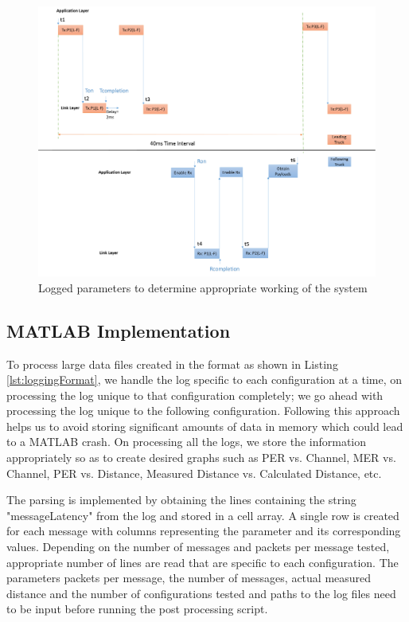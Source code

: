 \begin{figure}[h!]
    \includegraphics[width=1\textwidth]{figures/IndicationofLoggingParameters}
    \centering
    \caption{Logged parameters to determine appropriate working of the system}
    \label{fig:LoggedParametersDetermineAppWorking}    
\end{figure}




\subsection{MATLAB Implementation}
To process large data files created in the format as shown in Listing \ref{lst:loggingFormat}, we handle the log specific to each configuration at a time, on processing the log unique to that configuration completely; we go ahead with processing the log unique to the following configuration. Following this approach helps us to avoid storing significant amounts of data in memory which could lead to a MATLAB crash. On processing all the logs, we store the information appropriately so as to create desired graphs such as PER vs. Channel, MER vs. Channel, PER vs. Distance, Measured Distance vs. Calculated Distance, etc.

The parsing is implemented by obtaining the lines containing the string "messageLatency" from the log and stored in a cell array. A single row is created for each message with columns representing the parameter and its corresponding values. Depending on the number of messages and packets per message tested, appropriate number of lines are read that are specific to each configuration. The parameters packets per message, the number of messages, actual measured distance and the number of configurations tested and paths to the log files need to be input before running the post processing script.

